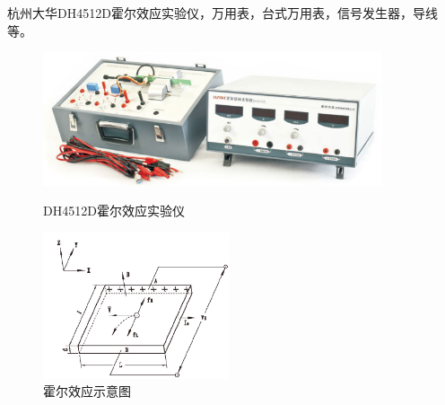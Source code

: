 \documentclass[11pt]{article}
\begin{document}
    \hspace*{2em} 杭州大华DH4512D霍尔效应实验仪，万用表，台式万用表，信号发生器，导线等。
    \begin{figure}[H]
        \centering
        \begin{minipage}[t]{0.65\linewidth}
            \centering
            \includegraphics[width=10cm]{Fig/1.jpg}
            \caption{DH4512D霍尔效应实验仪}
        \end{minipage}
        \begin{minipage}[t]{0.34\linewidth}
            \centering
            \includegraphics[width=5.5cm]{Fig/2.png}
            \caption{霍尔效应示意图}
            \label{fig:2}
        \end{minipage}
        
    \end{figure}
\end{document}
